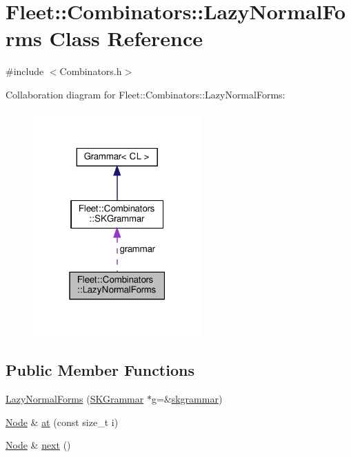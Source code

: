 \hypertarget{class_fleet_1_1_combinators_1_1_lazy_normal_forms}{}\section{Fleet\+:\+:Combinators\+:\+:Lazy\+Normal\+Forms Class Reference}
\label{class_fleet_1_1_combinators_1_1_lazy_normal_forms}


{\ttfamily \#include $<$Combinators.\+h$>$}



Collaboration diagram for Fleet\+:\+:Combinators\+:\+:Lazy\+Normal\+Forms\+:
\nopagebreak
\begin{figure}[H]
\begin{center}
\leavevmode
\includegraphics[width=183pt]{class_fleet_1_1_combinators_1_1_lazy_normal_forms__coll__graph}
\end{center}
\end{figure}
\subsection*{Public Member Functions}
\begin{DoxyCompactItemize}
\item 
\hyperlink{class_fleet_1_1_combinators_1_1_lazy_normal_forms_ab927e6ae4c5e0669c56e91ccc315e12f}{Lazy\+Normal\+Forms} (\hyperlink{class_fleet_1_1_combinators_1_1_s_k_grammar}{S\+K\+Grammar} $\ast$g=\&\hyperlink{namespace_fleet_1_1_combinators_a5293b7a2dcdbfb430b45fcf401e3bab0}{skgrammar})
\item 
\hyperlink{class_node}{Node} \& \hyperlink{class_fleet_1_1_combinators_1_1_lazy_normal_forms_adc4d6391055fa719667a368cc1dc1b96}{at} (const size\+\_\+t i)
\item 
\hyperlink{class_node}{Node} \& \hyperlink{class_fleet_1_1_combinators_1_1_lazy_normal_forms_a80295963dce26b84ff501d78ba6706b9}{next} ()
\end{DoxyCompactItemize}

